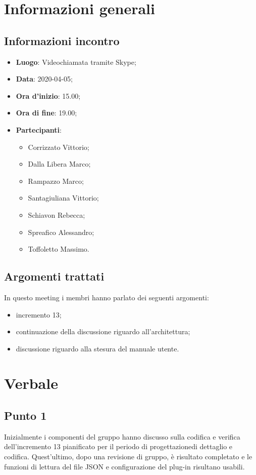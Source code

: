 \section{Informazioni generali}
    \subsection{Informazioni incontro}
        \begin{itemize}
            \item \textbf{Luogo}: Videochiamata tramite Skype;
            \item \textbf{Data}: 2020-04-05;
            \item \textbf{Ora d'inizio}: 15.00;
            \item \textbf{Ora di fine}: 19.00;
            \item \textbf{Partecipanti}: \begin{itemize}
                \item Corrizzato Vittorio;
                \item Dalla Libera Marco;
                \item Rampazzo Marco;
                \item Santagiuliana Vittorio;
                \item Schiavon Rebecca;
                \item Spreafico Alessandro;
                \item Toffoletto Massimo.
            \end{itemize}
        \end{itemize}
    \subsection{Argomenti trattati}
        In questo meeting i membri hanno parlato dei seguenti argomenti:
        \begin{itemize}
            \item incremento 13;
            \item continuazione della discussione riguardo all'architettura;
            \item discussione riguardo alla stesura del manuale utente.
        \end{itemize}
\section{Verbale}
    \subsection{Punto 1}
        Inizialmente i componenti del gruppo hanno discusso sulla codifica e verifica dell'incremento 13 pianificato per il periodo di progettazione\glosp di dettaglio e codifica. Quest'ultimo, dopo una revisione di gruppo, è risultato completato e le funzioni di lettura del file JSON e configurazione del plug-in risultano usabili.
